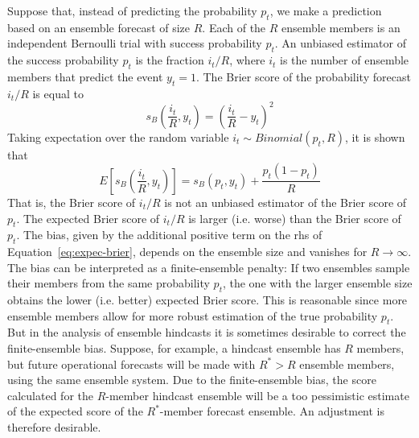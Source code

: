 \documentclass[article]{jss}\usepackage{graphicx, color}
\begin{document}
Suppose that, instead of predicting the probability $p_t$, we make a prediction based on an ensemble forecast of size $R$. 
Each of the $R$ ensemble members is an independent Bernoulli trial with success probability $p_t$.
An unbiased estimator of the success probability $p_t$ is the fraction $i_t/R$, where $i_t$ is the number of ensemble members that predict the event $y_t=1$.
The Brier score of the probability forecast $i_t/R$ is equal to
%
\begin{equation}
s_{B}\left(\frac{i_t}{R}, y_t\right) = \left(\frac{i_t}{R} - y_t\right)^2
\label{eq:unfair-brier}
\end{equation}
%
Taking expectation over the random variable $i_t \sim Binomial(p_t, R)$, it is shown that \citep{ferro2008effect}
%
\begin{equation}
E\left[s_{B}\left(\frac{i_t}{R}, y_t\right)\right] = s_{B}(p_t, y_t) +\frac{p_t(1-p_t)}{R}
\label{eq:expec-brier}
\end{equation}
%
That is, the Brier score of $i_t/R$ is not an unbiased estimator of the Brier score of $p_t$.
The expected Brier score of $i_t/R$ is larger (i.e. worse) than the Brier score of $p_t$.
The bias, given by the additional positive term on the rhs of Equation~\ref{eq:expec-brier}, depends on the ensemble size and vanishes for $R\rightarrow\infty$.
The bias can be interpreted as a finite-ensemble penalty: If two ensembles sample their members from the same probability $p_t$, the one with the larger ensemble size obtains the lower (i.e. better) expected Brier score.
This is reasonable since more ensemble members allow for more robust estimation of the true probability $p_t$.
But in the analysis of ensemble hindcasts it is sometimes desirable to correct the finite-ensemble bias.
Suppose, for example, a hindcast ensemble has $R$ members, but future operational forecasts will be made with $R^* > R$ ensemble members, using the same ensemble system. 
Due to the finite-ensemble bias, the score calculated for the $R$-member hindcast ensemble will be a too pessimistic estimate of the expected score of the $R^*$-member forecast ensemble.
An adjustment is therefore desirable.
\end{document}
